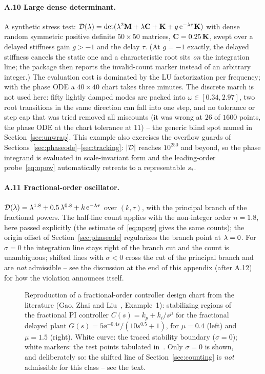 \paragraph{A.10 Large dense determinant.}
A synthetic stress test: $\mathcal{D}(\lambda)=\det(\lambda^2\mathbf{M}+\lambda\mathbf{C}+\mathbf{K}+
g\,\mathrm{e}^{-\lambda\tau}\mathbf{K})$ with dense random symmetric positive definite
$50\times50$ matrices, $\mathbf{C}=0.25\,\mathbf{K}$, swept over a delayed stiffness
gain $g>-1$ and the delay $\tau$. (At $g=-1$ exactly, the delayed stiffness
cancels the static one and a characteristic root sits \emph{on} the
integration line; the package then reports the invalid-count marker instead
of an arbitrary integer.) The evaluation cost is dominated by the LU
factorization per frequency; with the phase ODE a $40\times40$ chart takes
three minutes. The discrete march is not used here: fifty lightly damped
modes are packed into $\omega\in[0.34,2.97]$, two root transitions in the same
direction can fall into one step, and no tolerance or step cap that was tried
removed all miscounts (it was wrong at $26$ of $1600$ points, the phase ODE at
the chart tolerance at $11$) -- the generic blind spot named in
Section~\ref{sec:unwrap}. This
example also exercises the overflow guards of
Sections~\ref{sec:phaseode}--\ref{sec:tracking}: $|\mathcal{D}|$ reaches
$10^{250}$ and beyond, so the phase integrand is evaluated in scale-invariant
form and the leading-order probe~\eqref{eq:npow} automatically retreats to a
representable $s_\ast$.

\paragraph{A.11 Fractional-order oscillator.}
$\mathcal{D}(\lambda)=\lambda^{1.8}+0.5\,\lambda^{0.8}+k\,\mathrm{e}^{-\lambda\tau}$ over
$(k,\tau)$, with the principal branch of the fractional powers. The
half-line count applies with the non-integer order $n=1.8$, here passed
explicitly (the estimate of~\eqref{eq:npow} gives the same counts); the
origin offset of Section~\ref{sec:phaseode}
regularizes the branch point at $\lambda=0$. For $\sigma=0$ the integration
line stays right of the branch cut and the count is unambiguous; shifted
lines with $\sigma<0$ cross the cut of the principal branch and are
\emph{not} admissible -- see the discussion at the end of this appendix
(after A.12) for how the violation announces itself.

\begin{figure}[tb]
  \centering
  \caption{Reproduction of a fractional-order controller design chart from
  the literature (Gao, Zhai and Liu~\cite{gao2017robust}, Example~1):
  stabilizing regions of the fractional PI controller
  $C(s)=k_p+k_i/s^{\mu}$ for the fractional delayed plant
  $G(s)=5\ee^{-0.4s}/(10 s^{0.5}+1)$, for $\mu=0.4$ (left) and
  $\mu=1.5$ (right). White curve: the traced stability boundary
  ($\sigma=0$); white markers: the test points tabulated
  in~\cite{gao2017robust}. Only $\sigma=0$ is shown, and deliberately so: the
  shifted line of Section~\ref{sec:counting} is \emph{not} admissible for this
  class -- see the text.}\label{fig:fraccontroller}
\end{figure}

